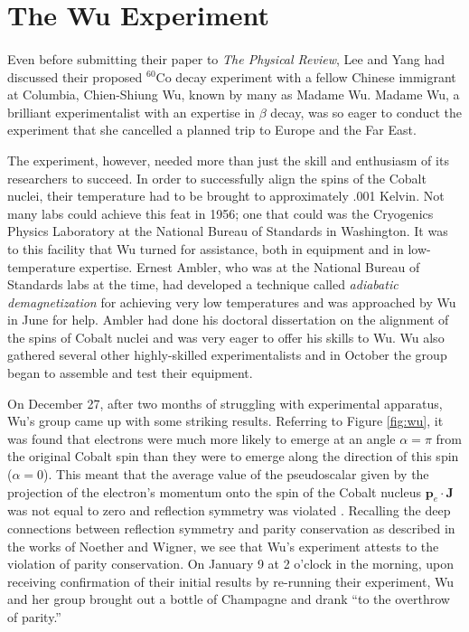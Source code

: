\documentclass[a4paper,12pt]{book}
\begin{document}
\section{The Wu Experiment}

\paragraph*{}Even before submitting their paper to \emph{The Physical Review}, Lee and Yang had discussed their proposed $^{60}$Co decay experiment with a fellow Chinese immigrant at Columbia, Chien-Shiung Wu, known by many as Madame Wu. Madame Wu, a brilliant experimentalist with an expertise in $\beta$ decay, was so eager to conduct the experiment that she cancelled a planned trip to Europe and the Far East. 

The experiment, however, needed more than just the skill and enthusiasm of its researchers to succeed. In order to successfully align the spins of the Cobalt nuclei, their temperature had to be brought to approximately .001 Kelvin. Not many labs could achieve this feat in 1956; one that could was the Cryogenics Physics Laboratory at the National Bureau of Standards in Washington. It was to this facility that Wu turned for assistance, both in equipment and in low-temperature expertise. Ernest Ambler, who was at the National Bureau of Standards labs at the time, had developed a technique called \emph{adiabatic demagnetization} for achieving very low temperatures and was approached by Wu in June for help. Ambler had done his doctoral dissertation on the alignment of the spins of Cobalt nuclei and was very eager to offer his skills to Wu. Wu also gathered several other highly-skilled experimentalists and in October the group began to assemble and test their equipment.

On December 27, after two months of struggling with experimental apparatus, Wu's group came up with some striking results. Referring to Figure \ref{fig:wu}, it was found that electrons were much more likely to emerge at an angle $\alpha=\pi$ from the original Cobalt spin than they were to emerge along the direction of this spin ($\alpha=0$). This meant that the average value of the pseudoscalar given by the projection of the electron's momentum onto the spin of the Cobalt nucleus $\mathbf{p}_{e}\cdot \mathbf{J}$ was not equal to zero and reflection symmetry was violated \cite{wu}. Recalling the deep connections between reflection symmetry and parity conservation as described in the works of Noether and Wigner, we see that Wu's experiment attests to the violation of parity conservation. On January 9 at 2 o'clock in the morning, upon receiving confirmation of their initial results by re-running their experiment, Wu and her group brought out a bottle of Champagne and drank ``to the overthrow of parity.''\cite{forman}
\end{document}
